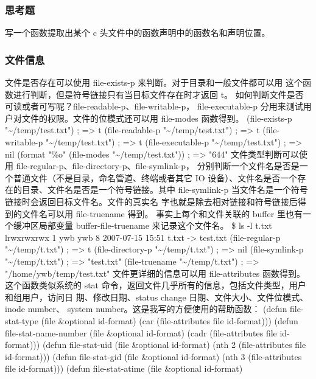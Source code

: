 \documentclass[11pt]{ctexart}
\begin{document}
{{{{\subsubsection{思考题}
\label{sec:orgb3c7fd6}
写一个函数提取出某个 c 头文件中的函数声明中的函数名和声明位置。
\subsubsection{文件信息}
\label{sec:org617c709}
文件是否存在可以使用 file-exists-p 来判断。对于目录和一般文件都可以用 这个函数进行判断，但是符号链接只有当目标文件存在时才返回 t。
如何判断文件是否可读或者可写呢？file-readable-p、file-writable-p， file-executable-p 分用来测试用户对文件的权限。文件的位模式还可以用 file-modes 函数得到。
(file-exists-p "\textasciitilde{}/temp/test.txt")              ; => t
(file-readable-p "\textasciitilde{}/temp/test.txt")            ; => t
(file-writable-p "\textasciitilde{}/temp/test.txt")            ; => t
(file-executable-p "\textasciitilde{}/temp/test.txt")          ; => nil
(format "\%o" (file-modes "\textasciitilde{}/temp/test.txt"))   ; => "644"
文件类型判断可以使用 file-regular-p、file-directory-p、file-symlink-p， 分别判断一个文件名是否是一个普通文件（不是目录，命名管道、终端或者其它 IO 设备）、文件名是否一个存在的目录、文件名是否是一个符号链接。其中 file-symlink-p 当文件名是一个符号链接时会返回目标文件名。文件的真实名 字也就是除去相对链接和符号链接后得到的文件名可以用 file-truename 得到。 事实上每个和文件关联的 buffer 里也有一个缓冲区局部变量 buffer-file-truename 来记录这个文件名。
\$ ls -l t.txt
lrwxrwxrwx 1 ywb ywb 8 2007-07-15 15:51 t.txt -> test.txt
(file-regular-p "\textasciitilde{}/temp/t.txt")         ; => t
(file-directory-p "\textasciitilde{}/temp/t.txt")       ; => nil
(file-symlink-p "\textasciitilde{}/temp/t.txt")         ; => "test.txt"
(file-truename "\textasciitilde{}/temp/t.txt")          ; => "/home/ywb/temp/test.txt"
文件更详细的信息可以用 file-attributes 函数得到。这个函数类似系统的 stat 命令，返回文件几乎所有的信息，包括文件类型，用户和组用户，访问日 期、修改日期、status change 日期、文件大小、文件位模式、inode number、 system number。这是我写的方便使用的帮助函数：
(defun file-stat-type (file \&optional id-format)
(car (file-attributes file id-format)))
(defun file-stat-name-number (file \&optional id-format)
(cadr (file-attributes file id-format)))
(defun file-stat-uid (file \&optional id-format)
(nth 2 (file-attributes file id-format)))
(defun file-stat-gid (file \&optional id-format)
(nth 3 (file-attributes file id-format)))
(defun file-stat-atime (file \&optional id-format)
}}}}
\end{document}

